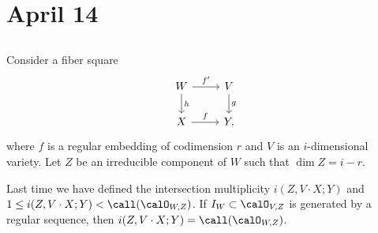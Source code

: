 \section{April 14}


\subsection{}

  Consider a fiber square
  \[
    \begin{tikzcd}
      W \arrow[d, "h"] \arrow[r, "f'"] & V \arrow[d, "g"] \\
      X \arrow[r, "f"] & Y,
    \end{tikzcd}
  \]
  where $f$ is a regular embedding of codimension $r$ and $V$ is an $i$-dimensional variety.
  Let $Z$ be an irreducible component of $W$ such that $\dim Z = i - r$.
  
  Last time we have defined the intersection multiplicity $i(Z, V \cdot X; Y)$ and $1 \leq i(Z, V \cdot X; Y) < \call(\calO_{W, Z})$.
  If $I_W \subset \calO_{V,Z}$ is generated by a regular sequence, then $i(Z, V \cdot X; Y) = \call(\calO_{W, Z})$.

